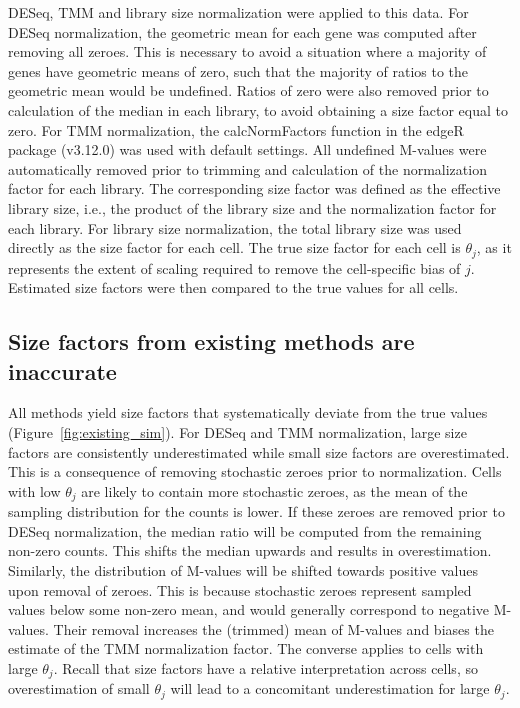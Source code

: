 \documentclass{bmcart}
\begin{document}
DESeq, TMM and library size normalization were applied to this data.
For DESeq normalization, the geometric mean for each gene was computed after removing all zeroes.
This is necessary to avoid a situation where a majority of genes have geometric means of zero, such that the majority of ratios to the geometric mean would be undefined.
Ratios of zero were also removed prior to calculation of the median in each library, to avoid obtaining a size factor equal to zero.
For TMM normalization, the calcNormFactors function in the edgeR package (v3.12.0) was used with default settings.
All undefined M-values were automatically removed prior to trimming and calculation of the normalization factor for each library.
The corresponding size factor was defined as the effective library size, i.e., the product of the library size and the normalization factor for each library.
For library size normalization, the total library size was used directly as the size factor for each cell.
The true size factor for each cell is $\theta_j$, as it represents the extent of scaling required to remove the cell-specific bias of $j$.
Estimated size factors were then compared to the true values for all cells.

\subsection*{Size factors from existing methods are inaccurate}
All methods yield size factors that systematically deviate from the true values (Figure~\ref{fig:existing_sim}).
For DESeq and TMM normalization, large size factors are consistently underestimated while small size factors are overestimated.
This is a consequence of removing stochastic zeroes prior to normalization.
Cells with low $\theta_j$ are likely to contain more stochastic zeroes, as the mean of the sampling distribution for the counts is lower.
If these zeroes are removed prior to DESeq normalization, the median ratio will be computed from the remaining non-zero counts.
This shifts the median upwards and results in overestimation.
Similarly, the distribution of M-values will be shifted towards positive values upon removal of zeroes.
This is because stochastic zeroes represent sampled values below some non-zero mean, and would generally correspond to negative M-values.
Their removal increases the (trimmed) mean of M-values and biases the estimate of the TMM normalization factor.
The converse applies to cells with large $\theta_j$.
Recall that size factors have a relative interpretation across cells, so overestimation of small $\theta_j$ will lead to a concomitant underestimation for large $\theta_j$.
\end{document}
